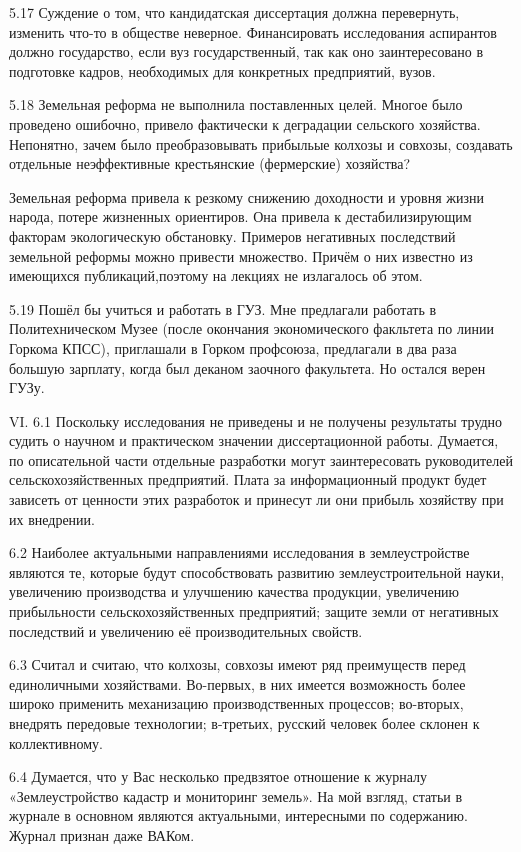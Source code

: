 5.17 Суждение о том, что кандидатская диссертация должна перевернуть, изменить что-то в обществе неверное. Финансировать исследования аспирантов должно государство, если вуз государственный, так как оно заинтересовано в подготовке кадров, необходимых для конкретных предприятий, вузов.

5.18 Земельная реформа не выполнила поставленных целей. Многое было проведено ошибочно, привело фактически к деградации сельского хозяйства. Непонятно, зачем было преобразовывать прибыльые колхозы и совхозы, создавать отдельные неэффективные крестьянские (фермерские) хозяйства?

Земельная реформа привела к резкому снижению доходности и уровня жизни народа, потере  жизненных ориентиров. Она привела к дестабилизирующим факторам экологическую обстановку. Примеров негативных последствий земельной реформы можно привести множество. Причём о них известно из имеющихся публикаций,поэтому на лекциях не излагалось об этом.

5.19 Пошёл бы учиться и работать в ГУЗ. Мне предлагали работать в Политехническом Музее (после окончания экономического факльтета по линии Горкома КПСС), приглашали в Горком профсоюза, предлагали в два раза большую зарплату, когда был деканом заочного факультета. Но остался верен ГУЗу.

VI.
6.1 Поскольку исследования не приведены и не получены результаты трудно судить о научном и практическом значении диссертационной работы. Думается, по описательной части отдельные разработки могут заинтересовать руководителей сельскохозяйственных предприятий. Плата за информационный продукт будет зависеть от ценности этих разработок и принесут ли они прибыль хозяйству при их внедрении.

6.2 Наиболее актуальными направлениями исследования в землеустройстве являются те, которые будут способствовать развитию землеустроительной науки, увеличению производства и улучшению качества продукции, увеличению прибыльности сельскохозяйственных предприятий; защите земли от негативных последствий и увеличению её производительных свойств.

6.3 Считал и считаю, что колхозы, совхозы имеют ряд преимуществ перед единоличными хозяйствами. Во-первых, в них имеется возможность более широко применить механизацию производственных процессов; во-вторых, внедрять передовые технологии; в-третьих, русский человек более склонен к коллективному.

6.4 Думается, что у Вас несколько предвзятое отношение к журналу «Землеустройство кадастр и мониторинг земель». На мой взгляд, статьи в журнале в основном являются актуальными, интересными по содержанию. Журнал признан даже ВАКом. 


